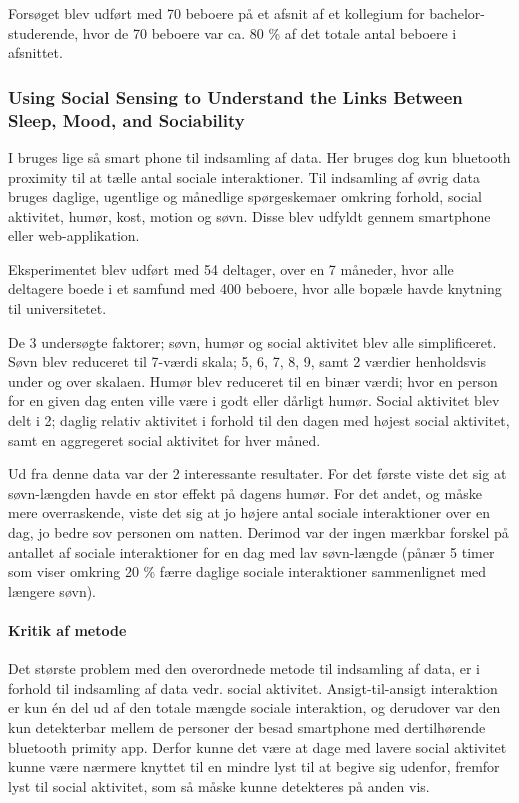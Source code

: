 Forsøget blev udført med 70 beboere på et afsnit af et kollegium for bachelor-studerende, hvor de 70 beboere var ca. 80 \% af det totale antal beboere i afsnittet.



\subsubsection{Using Social Sensing to Understand the Links Between Sleep, Mood, and Sociability}
I \citet{social_sensing_2} bruges lige så smart phone til indsamling af data.
Her bruges dog kun bluetooth proximity til at tælle antal sociale interaktioner.
Til indsamling af øvrig data bruges daglige, ugentlige og månedlige spørgeskemaer omkring forhold, social aktivitet, humør, kost, motion og søvn.
Disse blev udfyldt gennem smartphone eller web-applikation.

Eksperimentet blev udført med 54 deltager, over en 7 måneder, hvor alle deltagere boede i et samfund med 400 beboere, hvor alle bopæle havde knytning til universitetet.

De 3 undersøgte faktorer; søvn, humør og social aktivitet blev alle simplificeret.
Søvn blev reduceret til 7-værdi skala; 5, 6, 7, 8, 9, samt 2 værdier henholdsvis under og over skalaen.
Humør blev reduceret til en binær værdi; hvor en person for en given dag enten ville være i godt eller dårligt humør.
Social aktivitet blev delt i 2; daglig relativ aktivitet i forhold til den dagen med højest social aktivitet, samt en aggregeret social aktivitet for hver måned.

Ud fra denne data var der 2 interessante resultater.
For det første viste det sig at søvn-længden havde en stor effekt på dagens humør.
For det andet, og måske mere overraskende, viste det sig at jo højere antal sociale interaktioner over en dag, jo bedre sov personen om natten.
Derimod var der ingen mærkbar forskel på antallet af sociale interaktioner for en dag med lav søvn-længde (pånær 5 timer som viser omkring 20 \% færre daglige sociale interaktioner sammenlignet med længere søvn).

\paragraph{Kritik af metode}
Det største problem med den overordnede metode til indsamling af data, er i forhold til indsamling af data vedr. social aktivitet.
Ansigt-til-ansigt interaktion er kun én del ud af den totale mængde sociale interaktion, og derudover var den kun detekterbar mellem de personer der besad smartphone med dertilhørende bluetooth primity app.
Derfor kunne det være at dage med lavere social aktivitet kunne være nærmere knyttet til en mindre lyst til at begive sig udenfor, fremfor lyst til social aktivitet, som så måske kunne detekteres på anden vis.

